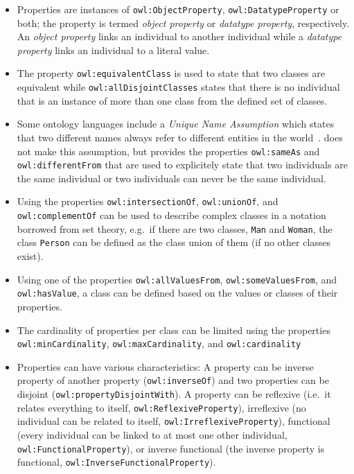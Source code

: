 \begin{itemize}
  \item Properties are instances of \texttt{owl:ObjectProperty}, \texttt{owl:DatatypeProperty} or both; the property is termed \emph{object property} or \emph{datatype property}, respectively. An \emph{object property} links an individual to another individual while a \emph{datatype property} links an individual to a literal value.
  \item The property \texttt{owl:equivalentClass} is used to state that two classes are equivalent while \texttt{owl:allDisjointClasses} states that there is no individual that is an instance of more than one class from the defined set of classes.
  \item Some ontology languages include a \emph{Unique Name Assumption} which states that two different names always refer to different entities in the world~\cite{unique_name_assumption}.  does not make this assumption, but provides the properties \texttt{owl:sameAs} and \texttt{owl:differentFrom} that are used to explicitely state that two individuals are the same individual or two individuals can never be the same individual.
  \item Using the properties \texttt{owl:intersectionOf}, \texttt{owl:unionOf}, and \texttt{owl:complementOf} can be used to describe complex classes in a notation borrowed from set theory, e.g.\ if there are two classes, \texttt{Man} and \texttt{Woman}, the class \texttt{Person} can be defined as the class union of them (if no other classes exist).
  \item Using one of the properties \texttt{owl:allValuesFrom}, \texttt{owl:someValuesFrom}, and \texttt{owl:\hspace{0pt}hasValue}, a class can be defined based on the values or classes of their properties.
  \item The cardinality of properties per class can be limited using the properties \texttt{owl:minCar\-di\-nal\-ity}, \texttt{owl:maxCardinality}, and \texttt{owl:cardinality}
  \item Properties can have various characteristics: A property can be inverse property of another property (\texttt{owl:inverseOf}) and two properties can be disjoint (\texttt{owl:property\hspace{0pt}DisjointWith}). A property can be reflexive (i.e.\ it relates everything to itself, \texttt{owl:\hspace{0pt}ReflexiveProperty}), irreflexive (no individual can be related to itself, \texttt{owl:Ir\-re\-flex\-iveProperty}), functional (every individual can be linked to at most one other individual, \texttt{owl:FunctionalProperty}), or inverse functional (the inverse property is functional, \texttt{owl:InverseFunctionalProperty}).
\end{itemize}

